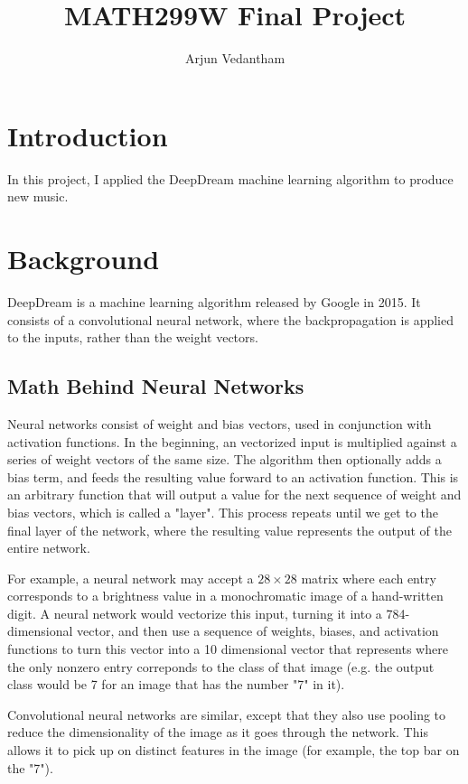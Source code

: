 \documentclass[11pt]{article}
\title{\textbf{MATH299W Final Project}}
\author{Arjun Vedantham}
\date{}
\begin{document}
\maketitle
\thispagestyle{empty}

\section{Introduction}
In this project, I applied the DeepDream machine learning algorithm to produce new music.

\section{Background}
DeepDream is a machine learning algorithm released by Google in 2015.
It consists of a convolutional neural network, where the backpropagation is applied to the inputs, rather than the weight vectors.

\subsection{Math Behind Neural Networks}
Neural networks consist of weight and bias vectors, used in conjunction with activation functions. In the beginning,
an vectorized input is multiplied against a series of weight vectors of the same size. The algorithm then optionally adds a bias term, and feeds the resulting value forward to
an activation function. This is an arbitrary function that will output a value for the next sequence of weight and bias vectors, which is called a "layer".
This process repeats until we get to the final layer of the network, where the resulting value represents the output of the entire network.

For example, a neural network may accept a $28 \times 28$ matrix where each entry corresponds to a brightness value in a monochromatic image of a hand-written digit. A neural network would vectorize
this input, turning it into a 784-dimensional vector, and then use a sequence of weights, biases, and activation functions to turn this vector into a 10 dimensional vector that represents
where the only nonzero entry correponds to the class of that image (e.g. the output class would be 7 for an image that has the number "7" in it).

Convolutional neural networks are similar, except that they also use pooling to reduce the dimensionality of the image as it goes through the network.
This allows it to pick up on distinct features in the image (for example, the top bar on the "7").
\end{document}

